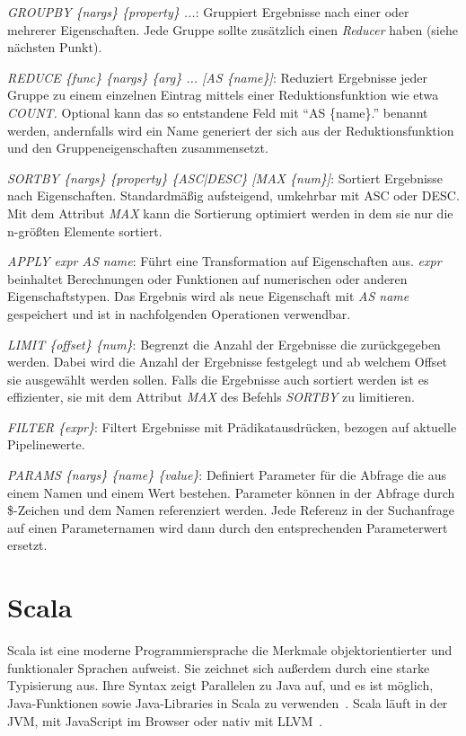 \emph{GROUPBY \{nargs\} \{property\} ...}: Gruppiert Ergebnisse nach einer oder mehrerer Eigenschaften. Jede Gruppe sollte zusätzlich einen \emph{Reducer} haben (siehe nächsten Punkt).

\emph{REDUCE \{func\} \{nargs\} \{arg\} ... [AS \{name\}]}: Reduziert Ergebnisse jeder Gruppe zu einem einzelnen Eintrag mittels einer Reduktionsfunktion wie etwa \emph{COUNT.} Optional kann das so entstandene Feld mit \enquote{AS \{name\}.} benannt werden, andernfalls wird ein Name generiert der sich aus der Reduktionsfunktion und den Gruppeneigenschaften zusammensetzt.

\emph{SORTBY \{nargs\} \{property\} \{ASC|DESC\} [MAX \{num\}]}: Sortiert Ergebnisse nach Eigenschaften. Standardmäßig aufsteigend, umkehrbar mit ASC oder DESC. Mit dem Attribut \emph{MAX} kann die Sortierung optimiert werden in dem sie nur die n-größten Elemente sortiert.

\emph{APPLY {expr} AS {name}}: Führt eine Transformation auf Eigenschaften aus. \emph{expr} beinhaltet Berechnungen oder Funktionen auf numerischen oder anderen Eigenschaftstypen. Das Ergebnis wird als neue Eigenschaft mit \emph{AS {name}} gespeichert und ist in nachfolgenden Operationen verwendbar.

\emph{LIMIT \{offset\} \{num\}}: Begrenzt die Anzahl der Ergebnisse die zurückgegeben werden. Dabei wird die Anzahl der Ergebnisse festgelegt und ab welchem Offset sie ausgewählt werden sollen. Falls die Ergebnisse auch sortiert werden ist es effizienter, sie mit dem Attribut \emph{MAX} des Befehls \emph{SORTBY} zu limitieren.

\emph{FILTER \{expr\}}: Filtert Ergebnisse mit Prädikatausdrücken, bezogen auf aktuelle Pipelinewerte.

\emph{PARAMS \{nargs\} \{name\} \{value\}}: Definiert Parameter für die Abfrage die aus einem Namen und einem Wert bestehen. Parameter können in der Abfrage durch \$-Zeichen und dem Namen referenziert werden. Jede Referenz in der Suchanfrage auf einen Parameternamen wird dann durch den entsprechenden Parameterwert ersetzt.

\section{Scala} %
Scala ist eine moderne Programmiersprache die Merkmale objektorientierter und funktionaler Sprachen aufweist.
Sie zeichnet sich außerdem durch eine starke Typisierung aus.
Ihre Syntax zeigt Parallelen zu Java auf, und es ist möglich, Java-Funktionen sowie Java-Libraries in Scala zu verwenden~\cite{epfl_scala_nodate-1, epfl_introduction_nodate}.
Scala läuft in der JVM, mit JavaScript im Browser oder nativ mit LLVM~\cite{epfl_scala_nodate}.

